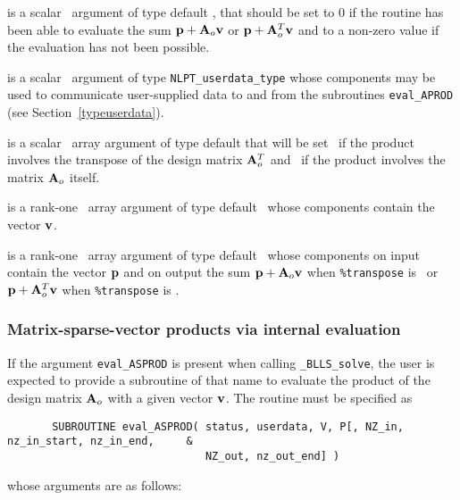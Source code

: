 \documentclass{galahad}
\newcommand{\packagename}{BLLS}
\newcommand{\fullpackagename}{\libraryname\_\packagename}
\newcommand{\solver}{{\tt \fullpackagename\_solve}}
\begin{document}
\begin{description}
 is a scalar \intentout\ argument of type default \integer,
that should be set to 0 if the routine has been able to evaluate the
sum ${\mathbf{p}} + {\mathbf{A}}_o {\mathbf{v}}$ or ${\mathbf{p}} + {\mathbf{A}}_o^T{\mathbf{v}}$
and to a non-zero value if the evaluation has not been possible.

 is a scalar \intentinout\ argument of type
{\tt NLPT\_userdata\_type} whose components may be used
to communicate user-supplied data to and from the subroutines
{\tt eval\_APROD}
(see Section~\ref{typeuserdata}).

 is a scalar \intentin\ array argument of type
default that will be set \true\ if the product involves the transpose
of the design matrix ${\mathbf{A}}_o^T$ and \false\ if the product involves
the matrix ${\mathbf{A}}_o$ itself.

 is a rank-one \intentin\ array argument of type default \realdp\
whose components contain the vector ${\mathbf{v}}$.

 is a rank-one \intentinout\ array argument of type default \realdp\
whose components on input contain the vector ${\mathbf{p}}$ and on output the
sum ${\mathbf{p}} + {\mathbf{A}}_o {\mathbf{v}}$ when {\tt \%transpose} is \false\ or
${\mathbf{p}} + {\mathbf{A}}_o^T {\mathbf{v}}$ when {\tt \%transpose} is \true.

\end{description}



\subsubsection{Matrix-sparse-vector products via internal evaluation\label{jvps}}

If the argument {\tt eval\_ASPROD} is present when calling \solver, the
user is expected to provide a subroutine of that name to evaluate the
product of the design matrix ${\mathbf{A}}_o$ with a given vector ${\mathbf{v}}$.
The routine must be specified as

\def\baselinestretch{0.8}
{\tt \begin{verbatim}
       SUBROUTINE eval_ASPROD( status, userdata, V, P[, NZ_in, nz_in_start, nz_in_end,     &
                               NZ_out, nz_out_end] )
\end{verbatim} }
\def\baselinestretch{1.0}
\noindent whose arguments are as follows:
\end{document}
